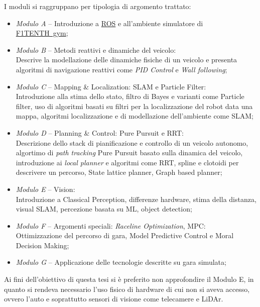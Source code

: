 \noindent I moduli si raggruppano per tipologia di argomento trattato:
\begin{itemize}
	\item \textit{Modulo A} -- Introduzione a \hyperref[sec:ros]{ROS} e all'ambiente simulatore di \hyperref[par:gym]{F1TENTH~gym};
	\item \textit{Modulo B} -- Metodi reattivi e dinamiche del veicolo: \\
	      Descrive la modellazione delle dinamiche fisiche di un veicolo e presenta algoritmi di navigazione
	      reattivi come \textit{PID Control} e \textit{Wall following};
	\item \textit{Modulo C} -- Mapping \& Localization: SLAM e Particle Filter:\\
	      Introduzione alla stima dello stato, filtro di Bayes e varianti come Particle filter, uso di
	      algoritmi basati su filtri per la localizzazione del robot data una mappa, algoritmi localizzazione e
	      di modellazione dell'ambiente come SLAM;
	\item \textit{Modulo D} -- Planning \& Control: Pure Pursuit e RRT:\\
	      Descrizione dello stack di pianificazione e controllo di un veicolo autonomo, algortimo di
	      \textit{path tracking} Pure Pursuit basato sulla dinamica del veicolo, introduzione ai
	      \textit{local planner} e algoritmi come RRT, spline e clotoidi per descrivere un percorso,
	      State lattice planner, Graph based planner;
	\item \textit{Modulo E} -- Vision:\\
	      Introduzione a Classical Perception, differenze hardware, stima della distanza, visual SLAM,
	      percezione basata su ML, object detection;
	\item \textit{Modulo F} -- Argomenti speciali: \textit{Raceline Optimization}, MPC:\\
	      Ottimizzazione del percorso di gara, Model Predictive Control e Moral Decision Making;
	\item \textit{Modulo G} -- Applicazione delle tecnologie descritte su gara simulata;
\end{itemize}

\noindent Ai fini dell'obiettivo di questa tesi si è preferito non approfondire il Modulo E,
in quanto si rendeva necessario l'uso fisico di hardware di cui non si aveva accesso,
ovvero l'auto e soprattutto sensori di visione come telecamere e LiDAr.

